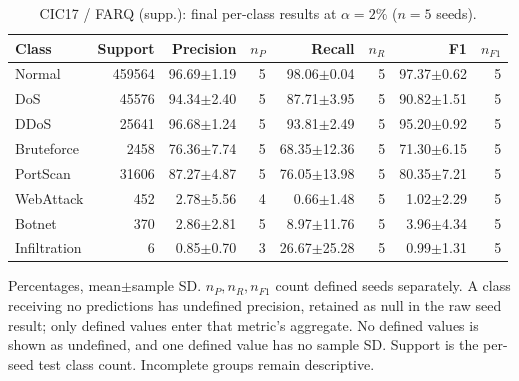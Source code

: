 \begin{table}[t]
\centering\scriptsize
\setlength{\tabcolsep}{3.3pt}
\caption{CIC17 / FARQ (supp.): final per-class results at $\alpha=2\%$ ($n=5$ seeds).}\label{tab:forgetting-class-cic_ids_2017-farq}
\begin{tabular}{lrrrrrrr}
\toprule
Class & Support & Precision & $n_P$ & Recall & $n_R$ & F1 & $n_{F1}$ \\
\midrule
Normal & 459564 & 96.69$\pm$1.19 & 5 & 98.06$\pm$0.04 & 5 & 97.37$\pm$0.62 & 5 \\
DoS & 45576 & 94.34$\pm$2.40 & 5 & 87.71$\pm$3.95 & 5 & 90.82$\pm$1.51 & 5 \\
DDoS & 25641 & 96.68$\pm$1.24 & 5 & 93.81$\pm$2.49 & 5 & 95.20$\pm$0.92 & 5 \\
Bruteforce & 2458 & 76.36$\pm$7.74 & 5 & 68.35$\pm$12.36 & 5 & 71.30$\pm$6.15 & 5 \\
PortScan & 31606 & 87.27$\pm$4.87 & 5 & 76.05$\pm$13.98 & 5 & 80.35$\pm$7.21 & 5 \\
WebAttack & 452 & 2.78$\pm$5.56 & 4 & 0.66$\pm$1.48 & 5 & 1.02$\pm$2.29 & 5 \\
Botnet & 370 & 2.86$\pm$2.81 & 5 & 8.97$\pm$11.76 & 5 & 3.96$\pm$4.34 & 5 \\
Infiltration & 6 & 0.85$\pm$0.70 & 3 & 26.67$\pm$25.28 & 5 & 0.99$\pm$1.31 & 5 \\
\bottomrule
\end{tabular}
\par\smallskip\begin{minipage}{0.98\textwidth}\scriptsize Percentages, mean$\pm$sample SD. $n_P,n_R,n_{F1}$ count defined seeds separately. A class receiving no predictions has undefined precision, retained as null in the raw seed result; only defined values enter that metric's aggregate. No defined values is shown as undefined, and one defined value has no sample SD. Support is the per-seed test class count. Incomplete groups remain descriptive.\end{minipage}
\end{table}

